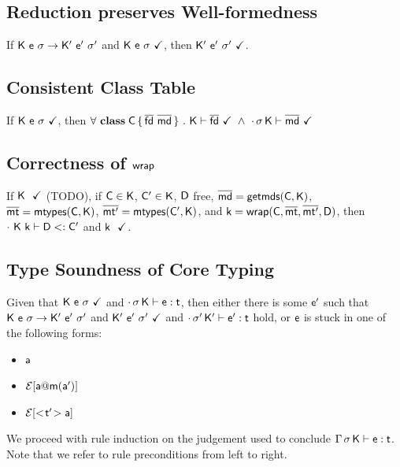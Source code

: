 \documentclass[acmlarge, anonymous, authordraft]{acmart}
\begin{document}
\subsection{Reduction preserves Well-formedness}

If $\Reduce \K\e\s \Kp\ep\sp$ and $\WFp\K{\e~\s}$, then $\WFp\Kp{\ep~\sp}$. 

\subsection{Consistent Class Table}

If $\WFp\K{\e~\s}$, then $\forall~\Class\C{\b{\fd}}{\b\md}~.~\WFtype\K{\b\fd}~\wedge~\WF\cdot\s\K{\b\md}$

\subsection{Correctness of $\xt{wrap}$}

If $\WFp \K$ (TODO), if $\C \in \K$, $\Cp \in \K$, $\D$ free, $\b\md = \getmds\C\K$, $\bmt = \classoff\C\K$, $\bmtp = \classoff\Cp\K$, and $\k = \wrap\C\bmt\bmtp\D$, then $\StrSub\cdot{\K~\k}\D\Cp$ and $\WFp \k$.

\subsection{Type Soundness of Core \kafka Typing}

Given that $\WFp\K{\e~\s}$ and $\EnvType\cdot\s\K\e\t$, then either there is some $\ep$ 
such that $\Reduce \K\e\s \Kp\ep\sp$ and $\WFp\Kp{\ep~\sp}$ and $\EnvType\cdot\sp\Kp\ep\t$ hold, 
or $\e$ is stuck in one of the following forms:
\begin{itemize} 
\item $\a$
\item $\EE[\DynCall\a\m{\ap}]$
\item $\EE[\SubCast\tp\a]$
\end{itemize}

We proceed with rule induction on the judgement used to conclude $\EnvType\Env\s\K\e\t$. 
Note that we refer to rule preconditions from left to right.
\end{document}
